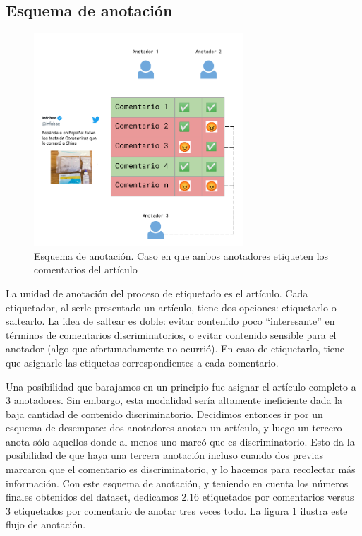 \subsection{Esquema de anotación}



\begin{figure}
    \centering
    \includegraphics[width=0.7\textwidth]{img/esquema_anotacion.pdf}
    \caption{Esquema de anotación. Caso en que ambos anotadores etiqueten los comentarios del artículo}
    \label{fig:annotation_schema}
\end{figure}

La unidad de anotación del proceso de etiquetado es el artículo. Cada etiquetador, al serle presentado un artículo, tiene dos opciones: etiquetarlo o saltearlo. La idea de saltear es doble: evitar contenido poco ``interesante'' en términos de comentarios discriminatorios, o evitar contenido sensible para el anotador (algo que afortunadamente no ocurrió). En caso de etiquetarlo, tiene que asignarle las etiquetas correspondientes a cada comentario.

Una posibilidad que barajamos en un principio fue asignar el artículo completo a 3 anotadores. Sin embargo, esta modalidad sería altamente ineficiente dada la baja cantidad de contenido discriminatorio. Decidimos entonces ir por un esquema de desempate: dos anotadores anotan un artículo, y luego un tercero anota sólo aquellos donde al menos uno marcó que es discriminatorio. Esto da la posibilidad de que haya una tercera anotación incluso cuando dos previas marcaron que el comentario es discriminatorio, y lo hacemos para recolectar más información. Con este esquema de anotación, y teniendo en cuenta los números finales obtenidos del dataset, dedicamos 2.16 etiquetados por comentarios versus 3 etiquetados por comentario de anotar tres veces todo. La figura \ref{fig:annotation_schema} ilustra este flujo de anotación.


